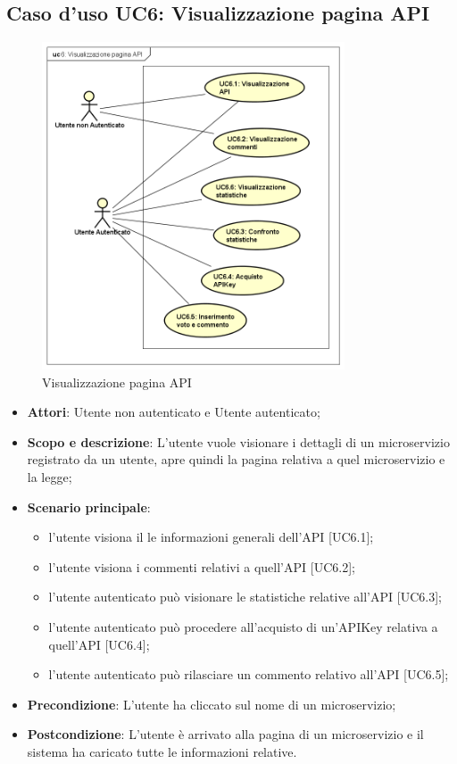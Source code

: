 \documentclass[12pt,a4paper,titlepage]{article}
\begin{document}
	\subsection{Caso d'uso UC6: Visualizzazione pagina API}
	\label{UC6}
	\begin{figure}[H]
		\centering
		\includegraphics[width=0.8\textwidth]{UseCase/VisualizzazionePaginaAPI}
		\caption{Visualizzazione pagina API}
	\end{figure}
	\begin{itemize}
		\item \textbf{Attori}: Utente non autenticato e Utente autenticato;
		\item \textbf{Scopo e descrizione}: L'utente vuole visionare i dettagli di un microservizio registrato da un utente, apre quindi la pagina relativa a quel microservizio e la legge;
		\item \textbf{Scenario principale}:
		\begin{itemize}
			\item l'utente visiona il le informazioni generali dell'API [UC6.1];
			\item l'utente visiona i commenti relativi a quell'API [UC6.2];
			\item l'utente autenticato può visionare le statistiche relative all'API [UC6.3];
			\item l'utente autenticato può procedere all'acquisto di un'APIKey relativa a quell'API [UC6.4];
			\item l'utente autenticato può rilasciare un commento relativo all'API [UC6.5];
		\end{itemize}
		\item \textbf{Precondizione}: L'utente ha cliccato sul nome di un microservizio;
		\item \textbf{Postcondizione}: L'utente è arrivato alla pagina di un microservizio e il sistema ha caricato tutte le informazioni relative.
	\end{itemize}
\end{document}
